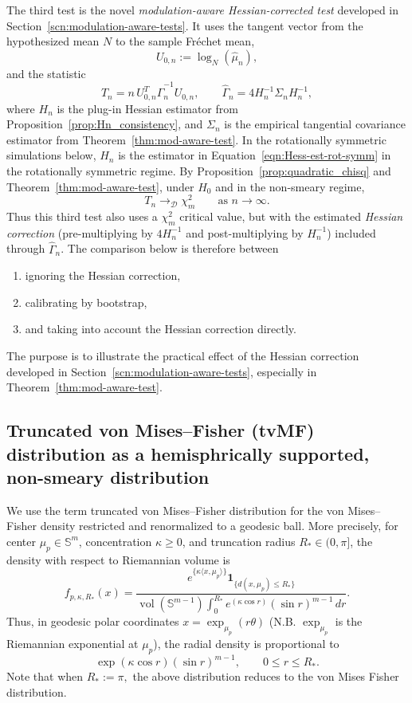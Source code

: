 \documentclass{amsart}
\theoremstyle{definition}
\theoremstyle{remark}
\newcommand\0{\boldsymbol{0}}
\begin{document}
The third test is the novel \emph{modulation-aware Hessian-corrected test} developed in
Section~\ref{scn:modulation-aware-tests}.  It uses the tangent vector from the hypothesized mean
\(N\) to the sample Fr\'echet mean,
\[
U_{0,n}:=\log_N(\hat\mu_n),
\]
and the statistic
\[
T_n
=
n\,U_{0,n}^{T}\widehat\Gamma_n^{-1}U_{0,n},
\qquad
\widehat\Gamma_n
=
4H_n^{-1}\Sigma_n H_n^{-1},
\]
where \(H_n\) is the plug-in Hessian estimator from Proposition~\ref{prop:Hn_consistency}, and
\(\Sigma_n\) is the empirical tangential covariance estimator from
Theorem~\ref{thm:mod-aware-test}.  In the rotationally symmetric simulations below, \(H_n\) is the
estimator in Equation~\eqref{eqn:Hess-est-rot-symm} in the rotationally symmetric regime.  By Proposition~\ref{prop:quadratic_chisq}
and Theorem~\ref{thm:mod-aware-test}, under \(H_0\) and in the non-smeary regime,
\[
T_n\rightarrow_{\mathcal D}\chi_m^2
\qquad\text{as } n\to\infty .
\]
Thus this third test also uses a \(\chi_m^2\) critical value, but with the estimated \textit{Hessian correction} (pre-multiplying by $4H_n^{-1}$ and post-multiplying by $H_n^{-1}$) included through 
\(\widehat\Gamma_n\).  The comparison below is therefore
between
\begin{enumerate}
    \item ignoring the Hessian correction,
    \item calibrating by bootstrap,
    \item  and taking into account the Hessian
correction directly.
\end{enumerate}

   The purpose is to illustrate the practical effect of the Hessian correction developed
in Section~\ref{scn:modulation-aware-tests}, especially in Theorem~\ref{thm:mod-aware-test}.
\subsection{Truncated von Mises--Fisher (tvMF) distribution as a hemisphrically supported, non-smeary distribution}\label{sec:tvMF}
We use the term truncated von Mises--Fisher distribution for the
von Mises--Fisher density restricted and renormalized to a geodesic ball.
More precisely, for center \(\mu_p\in\mathbb S^m\), concentration
\(\kappa\ge 0\), and truncation radius \(R_\ast \in (0, \pi]\), the density with
respect to Riemannian volume is
\[
f_{p,\kappa,R_\ast}(x)
=
\frac{
e^{\{\kappa\langle x,\mu_p\rangle\}}
\mathbf 1_{\{d(x,\mu_p)\le R_\ast\}}
}{
\operatorname{vol}(\mathbb S^{m-1})
\int_0^{R_\ast}e^{(\kappa\cos r)}(\sin r)^{m-1}\,dr
}.
\]
Thus, in geodesic polar coordinates \(x=\exp_{\mu_p}(r\theta)\) (N.B. $\exp_{\mu_p}$ is the Riemannian exponential at $\mu_p$), the
radial density is proportional to
\[
\exp(\kappa\cos r)(\sin r)^{m-1},\qquad 0\le r\le R_\ast.
\]
Note that when $R_\ast:=\pi,$ the above distribution reduces to the von Mises Fisher distribution.
\end{document}
